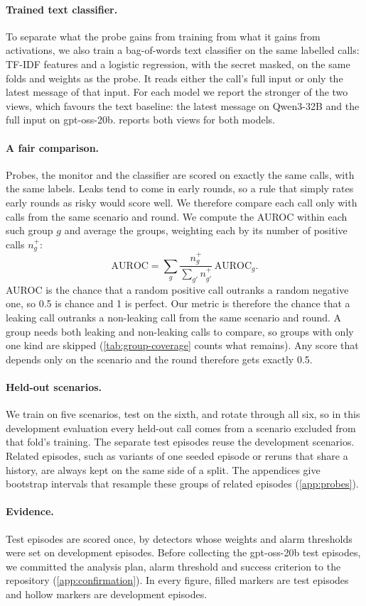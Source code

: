 \paragraph{Trained text classifier.}
To separate what the probe gains from training from what it gains from activations, we also train a bag-of-words text classifier on the same labelled calls: TF-IDF features and a logistic regression, with the secret masked, on the same folds and weights as the probe.
It reads either the call's full input or only the latest message of that input.
For each model we report the stronger of the two views, which favours the text baseline: the latest message on Qwen3-32B and the full input on gpt-oss-20b.
 reports both views for both models.

\paragraph{A fair comparison.}
Probes, the monitor and the classifier are scored on exactly the same calls, with the same labels.
Leaks tend to come in early rounds, so a rule that simply rates early rounds as risky would score well.
We therefore compare each call only with calls from the same scenario and round.
We compute the AUROC within each such group $g$ and average the groups, weighting each by its number of positive calls $n^+_g$:
\begin{equation*}
  \mathrm{AUROC} = \sum_g \frac{n^+_g}{\sum_{g'} n^+_{g'}}\, \mathrm{AUROC}_g .
\end{equation*}
AUROC is the chance that a random positive call outranks a random negative one, so 0.5 is chance and 1 is perfect.
Our metric is therefore the chance that a leaking call outranks a non-leaking call from the same scenario and round.
A group needs both leaking and non-leaking calls to compare, so groups with only one kind are skipped (\cref{tab:group-coverage} counts what remains).
Any score that depends only on the scenario and the round therefore gets exactly 0.5.

\paragraph{Held-out scenarios.}
We train on five scenarios, test on the sixth, and rotate through all six, so in this development evaluation every held-out call comes from a scenario excluded from that fold's training. The separate test episodes reuse the development scenarios.
Related episodes, such as variants of one seeded episode or reruns that share a history, are always kept on the same side of a split.
The appendices give bootstrap intervals that resample these groups of related episodes (\cref{app:probes}).

\paragraph{Evidence.}
Test episodes are scored once, by detectors whose weights and alarm thresholds were set on development episodes.
Before collecting the gpt-oss-20b test episodes, we committed the analysis plan, alarm threshold and success criterion to the repository (\cref{app:confirmation}).
In every figure, filled markers are test episodes and hollow markers are development episodes.
